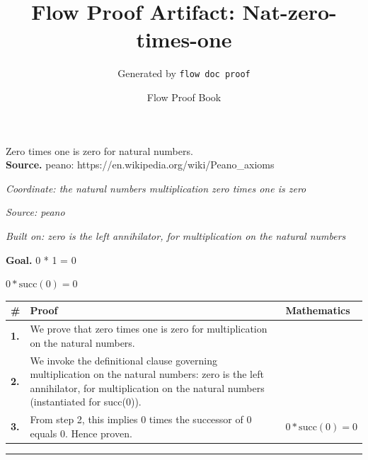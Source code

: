 \documentclass[11pt]{article}
\title{Flow Proof Artifact: Nat-zero-times-one}
\author{Generated by \texttt{flow doc proof}}
\date{Flow Proof Book}
\theoremstyle{definition}
\begin{document}
\maketitle
Zero times one is zero for natural numbers.\\[0.5em]
\textbf{Source.} peano: https://en.wikipedia.org/wiki/Peano\_axioms\\[0.5em]
\bigskip
{}\par
\smallskip\noindent\textit{Coordinate: the natural numbers \cdot multiplication \cdot zero times one is zero}\par
\smallskip\noindent\textit{Source: peano}\par
\smallskip\noindent\textit{Built on: zero is the left annihilator, for multiplication on the natural numbers}\par
\medskip
\noindent\textbf{Goal.} 0 * 1 = 0\par
\noindent$\displaystyle 0 * \mathrm{succ}(0) = 0$\par
\medskip
\noindent
\begin{tabular}{@{} >{\raggedright\arraybackslash}p{} >{\raggedright\arraybackslash}p{} >{\raggedleft\arraybackslash}p{} @{}}
\textbf{\#} & \textbf{Proof} & \textbf{Mathematics} \\
\midrule
\textbf{1.} & We prove that zero times one is zero for multiplication on the natural numbers. & \\[0.45em]
\textbf{2.} & We invoke the definitional clause governing multiplication on the natural numbers: zero is the left annihilator, for multiplication on the natural numbers (instantiated for succ(0)). & \\[0.45em]
\textbf{3.} & From step 2, this implies 0 times the successor of 0 equals 0. Hence proven. & $\displaystyle 0 * \mathrm{succ}(0) = 0$ \\[0.45em]
\bottomrule
\end{tabular}
\label{thm:Nat-multiplication-zero_times_one_is_zero}
\par\medskip\hrule
\end{document}
